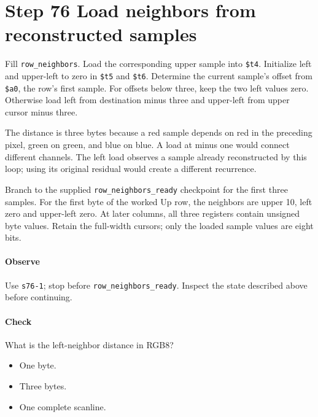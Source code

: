 \section{Step 76 Load neighbors from reconstructed samples}
Fill \texttt{row\_neighbors}. Load the corresponding upper sample into \texttt{\$t4}. Initialize left and upper-left to zero in \texttt{\$t5} and \texttt{\$t6}. Determine the current sample’s offset from \texttt{\$a0}, the row’s first sample. For offsets below three, keep the two left values zero. Otherwise load left from destination minus three and upper-left from upper cursor minus three.

The distance is three bytes because a red sample depends on red in the preceding pixel, green on green, and blue on blue. A load at minus one would connect different channels. The left load observes a sample already reconstructed by this loop; using its original residual would create a different recurrence.

Branch to the supplied \texttt{row\_neighbors\_ready} checkpoint for the first three samples. For the first byte of the worked Up row, the neighbors are upper 10, left zero and upper-left zero. At later columns, all three registers contain unsigned byte values. Retain the full-width cursors; only the loaded sample values are eight bits.

\paragraph{Observe} Use \texttt{s76-1}; stop before \texttt{row\_neighbors\_ready}. Inspect the state described above before continuing.

\paragraph{Check} What is the left-neighbor distance in RGB8?
\begin{itemize}
  \item[A.] One byte.
  \item[B.] Three bytes.
  \item[C.] One complete scanline.
\end{itemize}
